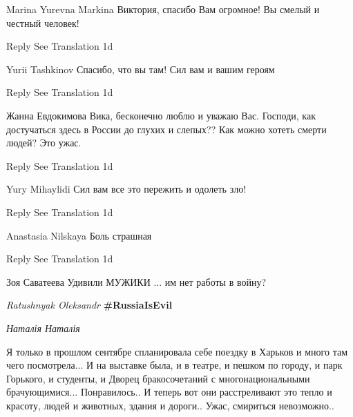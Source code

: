 \begin{itemize}
Marina Yurevna Markina
Виктория, спасибо Вам огромное! Вы смелый и честный человек!

    Reply
    See Translation
    1d

Yurii Tashkinov
Спасибо, что вы там! Сил вам и вашим героям

    Reply
    See Translation
    1d

Жанна Евдокимова
Вика, бесконечно люблю и уважаю Вас. Господи, как достучаться здесь в России до глухих и слепых?? Как можно хотеть смерти людей? Это ужас.

    Reply
    See Translation
    1d

Yury Mihaylidi
Сил вам все это пережить и одолеть зло!

    Reply
    See Translation
    1d

Anastasia Nilskaya
Боль страшная

    Reply
    See Translation
    1d

Зоя Саватеева
Удивили МУЖИКИ ... им нет работы в войну?


\emph{Ratushnyak Oleksandr}
\textbf{\#RussiaIsEvil}

\emph{Наталія Наталія}

Я только в прошлом сентябре спланировала себе поездку в Харьков и много там
чего посмотрела... И на выставке была, и в театре, и пешком по городу, и парк
Горького, и студенты, и Дворец бракосочетаний с многонациональными
брачующимися... Понравилось.. И теперь вот они расстреливают это тепло и
красоту, людей и животных, здания и дороги.. Ужас, смириться невозможно..

\end{itemize} %

